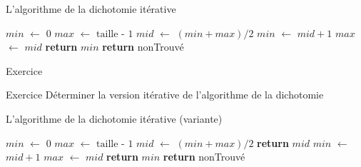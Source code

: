\documentclass[10pt,xcolor=dvipsnames]{beamer}
\newcommand*\Let[2]{\State #1 $\gets$ #2}
\begin{document}
\begin{frame}{L'algorithme de la dichotomie itérative}
    
\begin{tcolorbox}
  \begin{algorithmic}[1]
    \Let{$min$}{$0$}
    \Let{$max$}{$\text{taille - 1}$}
        \Let{$mid$}{$( min + max ) / 2 $}
            \Let{$min$}{$mid+1$}
        \Else
            \Let{$max$}{$mid$}
        \EndIf
    \EndWhile 
        \State \textbf{return} $min$
    \Else
        \State \textbf{return} nonTrouvé
    \EndIf
    \EndFunction
  \end{algorithmic}
\end{tcolorbox}

\vspace{-0.2cm}


\end{frame}

\begin{frame}{Exercice}
    \begin{exampleblock}{Exercice}
        Déterminer la version itérative de l'algorithme de la dichotomie
    \end{exampleblock}
\end{frame}

\begin{frame}{L'algorithme de la dichotomie itérative (variante)}

\begin{tcolorbox}
  \begin{algorithmic}[1]
    \Let{$min$}{$0$}
    \Let{$max$}{$\text{taille - 1}$}
        \Let{$mid$}{$( min + max ) / 2 $}
            \State \textbf{return} $mid$
        \EndIf
            \Let{$min$}{$mid+1$}
        \Else
            \Let{$max$}{$mid$}
        \EndIf
    \EndWhile 
        \State \textbf{return} $min$
    \Else
        \State \textbf{return} nonTrouvé
    \EndIf
    \EndFunction
  \end{algorithmic}
\end{tcolorbox}



\end{frame}
\end{document}
